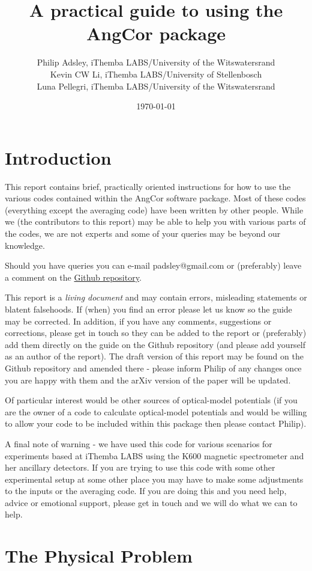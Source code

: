 \documentclass[a4paper,10pt]{article}
\title{A practical guide to using the AngCor package}
\author{Philip Adsley, iThemba LABS/University of the Witswatersrand\\
Kevin CW Li, iThemba LABS/University of Stellenbosch\\
Luna Pellegri, iThemba LABS/University of the Witswatersrand}
\date{\today}
\begin{document}
\lstset{language=bash}
\maketitle

\section{Introduction}

This report contains brief, practically oriented instructions for how to use the various codes contained within the AngCor software package. Most of these codes (everything except the averaging code) have been written by other people. While we (the contributors to this report) may be able to help you with various parts of the codes, we are not experts and some of your queries may be beyond our knowledge.

Should you have queries you can e-mail padsley@gmail.com or (preferably) leave a comment on the \href{https://github.com/padsley/AngCorPackage}{Github repository}.

This report is a {\it living document} and may contain errors, misleading statements or blatent falsehoods. If (when) you find an error please let us know so the guide may be corrected. In addition, if you have any comments, suggestions or corrections, please get in touch so they can be added to the report or (preferably) add them directly on the guide on the Github repository (and please add yourself as an author of the report). The draft version of this report may be found on the Github repository and amended there - please inform Philip of any changes once you are happy with them and the arXiv version of the paper will be updated.

Of particular interest would be other sources of optical-model potentials (if you are the owner of a code to calculate optical-model potentials and would be willing to allow your code to be included within this package then please contact Philip).

A final note of warning - we have used this code for various scenarios for experiments based at iThemba LABS using the K600 magnetic spectrometer and her ancillary detectors. If you are trying to use this code with some other experimental setup at some other place you may have to make some adjustments to the inputs or the averaging code. If you are doing this and you need help, advice or emotional support, please get in touch and we will do what we can to help.

\section{The Physical Problem}
\end{document}
